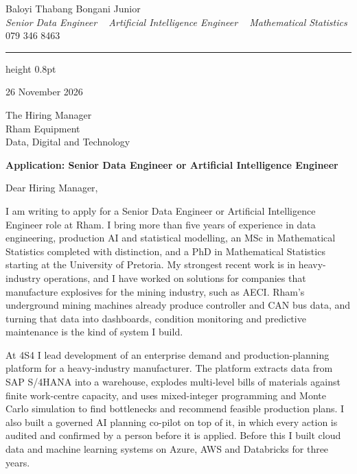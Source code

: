\documentclass[a4paper,11pt]{article}
\begin{document}
\begin{center}
    {\huge Baloyi Thabang Bongani Junior} \\ \vspace{2pt}
    {\large\textit{Senior Data Engineer \textbar~ Artificial Intelligence Engineer \textbar~ Mathematical Statistics}} \\ \vspace{4pt}
    {079 346 8463} ~\textbar~
    \href{mailto:Baloyibongani1@gmail.com}{\color{blue}{Baloyibongani1@gmail.com}} ~\textbar~
    \href{https://www.linkedin.com/in/thabang-bongani-junior-baloyi-2622b0286/}{\color{blue}{LinkedIn}} ~\textbar~
    \href{https://github.com/thabangTheActuaryCoder}{\color{blue}{GitHub}}
\end{center}
{\color{airforceblue}\hrule height 0.8pt}

\vspace{6pt}
26 November 2026

The Hiring Manager \\
Rham Equipment \\
Data, Digital and Technology

\textbf{Application: Senior Data Engineer or Artificial Intelligence Engineer}

Dear Hiring Manager,

I am writing to apply for a Senior Data Engineer or Artificial Intelligence Engineer role at
Rham. I bring more than five years of experience in data engineering, production AI and
statistical modelling, an MSc in Mathematical Statistics completed with distinction, and a PhD in
Mathematical Statistics starting at the University of Pretoria. My strongest recent work is in
heavy-industry operations, and I have worked on solutions for companies that manufacture explosives
for the mining industry, such as AECI. Rham's underground mining machines already produce controller and CAN bus data, and turning that data into dashboards, condition monitoring and predictive maintenance is the kind of system I build.

At 4S4 I lead development of an enterprise demand and production-planning platform for a
heavy-industry manufacturer. The platform extracts data from SAP S/4HANA into a warehouse, explodes multi-level
bills of materials against finite work-centre capacity, and uses mixed-integer programming
and Monte Carlo simulation to find bottlenecks and recommend feasible production plans. I also built a governed AI planning co-pilot on top
of it, in which every action is audited and confirmed by a person before it is applied. Before this I
built cloud data and machine learning systems on Azure, AWS and Databricks for three years.
\end{document}

